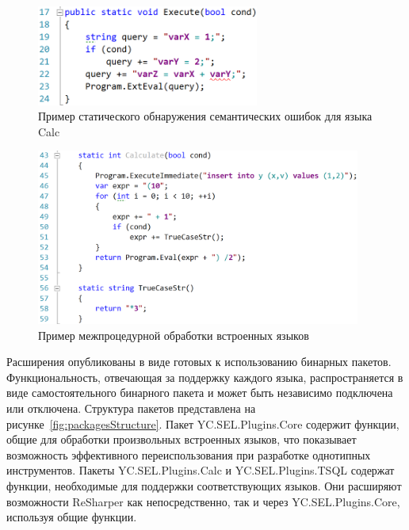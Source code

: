 \begin{figure}[H]
  \centering
 \includegraphics[width=0.65\textwidth]{pics/undefined_variable.png}
 \caption{Пример статического обнаружения семантических ошибок для языка Calc}
 \label{fig:undeclaredVars}
\end{figure}

\begin{figure}[H]
  \centering
 \includegraphics[width=0.95\textwidth]{pics/sql_calc_cycle.png}
 \caption{Пример межпроцедурной обработки встроенных языков}
 \label{fig:interProc}
\end{figure}

Расширения опубликованы в виде готовых к использованию бинарных пакетов. Функциональность, отвечающая за поддержку каждого языка, распространяется в виде самостоятельного бинарного пакета и может быть независимо подключена или отключена. Структура пакетов представлена на рисунке~\ref{fig:packagesStructure}. Пакет YC.SEL.Plugins.Core содержит функции, общие для обработки произвольных встроенных языков, что показывает возможность эффективного переиспользования при разработке однотипных инструментов. Пакеты YC.SEL.Plugins.Calc и YC.SEL.Plugins.TSQL содержат функции, необходимые для поддержки соответствующих языков. Они расширяют возможности ReSharper как непосредственно, так и через YC.SEL.Plugins.Core, используя общие функции.

